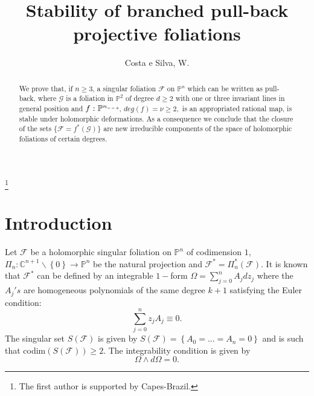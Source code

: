 \documentclass{amsart}
\theoremstyle{definition}
\theoremstyle{proposition}
\numberwithin{equation}{section}
\theoremstyle{main}
\begin{document}
\title[Branched pull-back components]{Stability of branched pull-back projective foliations}

\author{Costa e Silva, W.}
\thanks{The first author is supported by Capes-Brazil.}



\begin{abstract}  We prove that, if $n\geq 3$, a singular foliation $\mathcal{F}$ on $\mathbb P^n$ which can be written as pull-back, where $\mathcal{G}$ is a  foliation in $ {\mathbb P^2}$ of degree $d\geq2$ with one or three invariant lines in general position and $f:{\mathbb P^n}{\mathbin{\tikz [baseline=-0.25ex,-latex, dashed,->,densely dashed] \draw [->,densely dashed] (0pt,
0.5ex) -- (1.3em,0.5ex);}}$, $deg\left(f\right)=\nu\geq2,$ is an appropriated rational map, is stable under holomorphic deformations. As a consequence we conclude that the closure of the sets $\{\mathcal {F}= f^{*}\left(\mathcal{G}\right)\}$ are new irreducible components of the space of holomorphic foliations of certain degrees.\end{abstract}

\maketitle
\tableofcontents

\section{Introduction}
Let $\mathcal F$ be a holomorphic singular foliation on $\mathbb P^{n}$ of codimension $1$, \break$\Pi_{n}:\mathbb C^{n+1}\backslash \left\{0\right\} \to \mathbb P^{n}$  be the natural projection and $\mathcal F^*=\Pi_{n}^*\left(\mathcal F\right).$ It is known that $\mathcal F^*$ can be defined by an integrable $1-$form $\Omega=\sum_{j=0}^{n}A_{j}dz_{j}$ where the $A_{j}'s$ are homogeneous polynomials of the same degree $k+1$ satisfying the Euler condition:
\begin{equation}\label{rel-1}
\sum_{j=0}^{n}z_{j}A_{j}\equiv0.
\end{equation}
The singular set $S(\mathcal F)$ is given by $S(\mathcal F)=\left\{A_{0}=...=A_{n}=0\right\}$
and is such that codim$\left(S\left(\mathcal F\right)\right)\geq2$. The integrability condition is given by 
\begin{equation}\label{rel-2}
\Omega \wedge d\Omega=0.
\end{equation}
\end{document}
